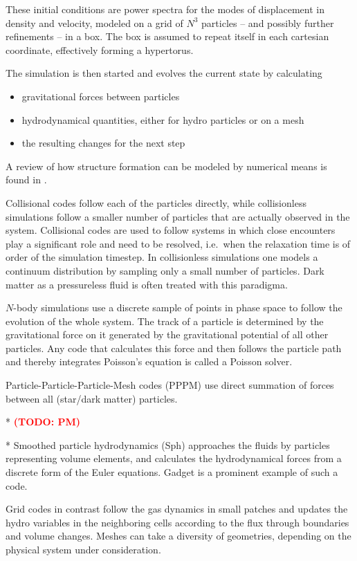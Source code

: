 \documentclass[useAMS,usenatbib]{mn2e}
\newcommand{\TODO}[1]{\textsc{\textbf{\textcolor{red}{(TODO: #1)}}}}
\begin{document}
These initial conditions are power spectra for the modes of
displacement in density and velocity, modeled on a grid of $N^3$
particles -- and possibly further refinements -- in a box. The box is
assumed to repeat itself in each cartesian coordinate, effectively
forming a hypertorus.

The simulation is then started and evolves the current state by
calculating

\begin{itemize}
\item gravitational forces between particles
\item hydrodynamical quantities, either for hydro particles or on a mesh
\item the resulting changes for the next step
\end{itemize}

A review of how structure formation can be modeled by numerical means
is found in \cite{Bagla2005}.

Collisional codes follow each of the particles directly, while
collisionless simulations follow a smaller number of particles that
are actually observed in the system. Collisional codes are used to
follow systems in which close encounters play a significant role and
need to be resolved, i.e.\ when the relaxation time is of order of the
simulation timestep. In collisionless simulations one models a
continuum distribution by sampling only a small number of
particles. Dark matter as a pressureless fluid is often treated with
this paradigma.

$N$-body simulations use a discrete sample of points in phase space
to follow the evolution of the whole system. The track of a particle
is determined by the gravitational force on it generated by the
gravitational potential of all other particles. Any code that
calculates this force and then follows the particle path and thereby
integrates Poisson's equation is called a Poisson solver.

Particle-Particle-Particle-Mesh codes (PPPM) use direct summation of forces
between all (star/dark matter) particles.

* \TODO{PM}

* Smoothed particle hydrodynamics ({\sc Sph}) approaches the fluids by
particles representing volume elements, and calculates the
hydrodynamical forces from a discrete form of the Euler
equations. Gadget is a prominent example of such a code.

Grid codes in contrast follow the gas dynamics in small patches and
updates the hydro variables in the neighboring cells according to the
flux through boundaries and volume changes. Meshes can take a
diversity of geometries, depending on the physical system under
consideration.
\end{document}
